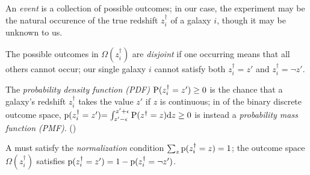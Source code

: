 \begin{definition}\label{def:event}
	An \textit{event} is a collection of possible outcomes;
	in our case, the experiment may be the natural occurence of the true redshift $z_{i}^{\dagger}$ of a galaxy $i$, though it may be unknown to us.
\end{definition}

\begin{definition}\label{def:disjoint}
	The possible outcomes in $\Omega(z_{i}^{\dagger})$ are \textit{disjoint} if one occurring means that all others cannot occur; 
	our single galaxy $i$ cannot satisfy both ${z^{\dagger}_{i} = z'}$ and ${z^{\dagger}_{i} = \lnot z'}$.
\end{definition}

\begin{definition}\label{def:pdens}
	The \textit{probability density function (PDF)} ${{\mathrm{P}}(z^{\dagger}_{i} = z') \geq 0}$ is the chance that a galaxy's redshift $z_{i}^{\dagger}$ takes the value $z'$ if $z$ is continuous;
    in  of the binary discrete outcome space, ${\mathrm{p}(z^{\dagger}_{i} = z') {= \int_{z'-\epsilon}^{z'+\epsilon} \mathrm{P}(z^{\dagger} = z) \mathrm{d}z} \geq 0}$ is instead a \textit{probability mass function (PMF)}.
    ()
\end{definition}

\begin{definition}\label{def:normalization}
	A  must satisfy the \textit{normalization} condition ${{\sum_{z} \mathrm{p}(z^{\dagger}_{i} = z)} = 1}$;
	the  outcome space $\Omega(z^{\dagger}_{i})$ satisfies ${\mathrm{p}(z^{\dagger}_{i} = z') = 1 - \mathrm{p}(z^{\dagger}_{i} = \lnot z')}$.
\end{definition}

